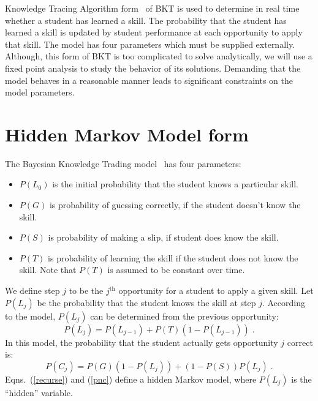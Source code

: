 \documentclass[jedm,acmnow]{acmtrans2m}
\begin{document}

Knowledge Tracing Algorithm form~\cite{corbett_knowledge_1995} 
of BKT is used to 
determine in real time whether a student has learned a skill.
The probability that the student has learned a skill is 
updated by student performance at each opportunity to apply
that skill.  The model has four parameters which must be 
supplied externally.  Although, this form of BKT is too complicated
to solve analytically, we will use a fixed point analysis to
study the behavior of its solutions.  Demanding that the model behaves
in a reasonable manner leads to significant constraints on the model parameters.

\section{Hidden Markov Model form}

The Bayesian Knowledge Trading model~\cite{corbett_knowledge_1995} 
has four parameters:
%
\begin{itemize}
   \item $P(L_0)$ is the initial probability that the student knows a particular skill.
   \item $P(G)$ is probability of guessing correctly, if the student        
         doesn't know the skill.
   \item $P(S)$ is probability of making a slip, if student does know the skill.
   \item $P(T)$ is probability of learning the skill if the student 
         does not know the skill.  Note that $P(T)$ is assumed to 
         be constant over time.
\end{itemize}
%
We define step $j$ to be the $j^\mathrm{th}$ opportunity for a student
to apply a given skill.
Let $P(L_j)$ be the probability that the student knows the skill at 
step $j$. According to the model,  $P(L_j)$ can
be determined from the previous opportunity:
%
\begin{equation}
          P(L_j) = P(L_{j-1}) + P(T)\left(1-P(L_{j-1})\right)  \; . 
        \label{recurse}
\end{equation}
%
In this model, the probability that the student actually gets
opportunity $j$ correct is:
%
\begin{equation}
        P(C_j) = P(G)\left(1-P(L_j)\right) + \left(1-P(S)\right) P(L_j) \; . 
         \label{pnc}
\end{equation}
%
Eqns.~(\ref{recurse}) and (\ref{pnc}) define a hidden Markov model, 
where $P(L_j)$ is the ``hidden'' variable.
\end{document}
